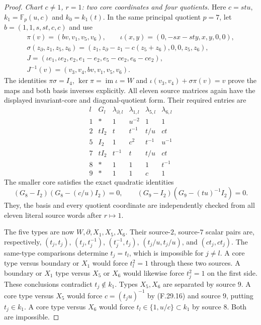 \begin{proof}
\emph{Chart $c\ne1$, $r=1$: two core coordinates and four quotients.}
Here $c=stu$, $k_1=\mathbb F_p(u,c)$ and
$k_0=k_1(t)$. In the same principal quotient
$p=7$, let $b=(1,1,s,st,c,c)$ and use
\[
 \begin{gathered}
 \pi(v)=(bv,v_1,v_5,v_6),\qquad
 \iota(x,y)=(0,-sx-sty,x,y,0,0),\\
 \sigma(z_\partial,z_1,z_5,z_6)
       =(z_1,z_\partial-z_1-c(z_5+z_6),0,0,z_5,z_6),\\
 J=(\iota e_1,\iota e_2,e_2,e_1-e_2,e_5-ce_2,e_6-ce_2),\\
 J^{-1}(v)=(v_3,v_4,bv,v_1,v_5,v_6).
 \end{gathered}                                                \tag{F.29.14}
\]
The identities $\pi\sigma=I_4$,
$\ker\pi=\operatorname{im}\iota=W$ and
$\iota(v_3,v_4)+\sigma\pi(v)=v$ prove the
maps and both basis inverses explicitly.
All eleven source matrices again have the
displayed invariant-core and diagonal-quotient
form. Their required entries are
\[
 \begin{array}{c|c|cccc}
 l&G_l&\lambda_{\partial,l}&\lambda_{1,l}
                         &\lambda_{5,l}&\lambda_{6,l}\\\hline
 1&*&1&u^{-2}&1&1\\
 2&tI_2&t&t^{-1}&t/u&ct\\
 5&I_2&1&c^2&t^{-1}&u^{-1}\\
 7&tI_2&t^{-1}&t&t/u&ct\\
 8&*&1&1&1&t^{-1}\\
 9&*&1&1&c&1
 \end{array}
                                                               \tag{F.29.15}
\]
The smaller core satisfies the exact quadratic
identities
\[
 (G_8-I_2)(G_8-(c/u)I_2)=0,
 \qquad (G_9-I_2)(G_9-(tu)^{-1}I_2)=0.
                                                               \tag{F.29.16}
\]
They, the basis and every quotient coordinate
are independently checked from all eleven
literal source words after $r\mapsto1$.

The five types are now $W,\partial,X_1,X_5,X_6$.
Their source-$2$, source-$7$ scalar pairs are,
respectively,
$(t_j,t_j)$, $(t_j,t_j^{-1})$,
$(t_j^{-1},t_j)$, $(t_j/u,t_j/u)$,
and $(ct_j,ct_j)$.
The same-type comparisons determine $t_j=t_l$,
which is impossible for $j\ne l$.
A core type versus boundary or $X_1$ would
force $t_l^2=1$ through these two sources.
A boundary or $X_1$ type versus $X_5$ or $X_6$
would likewise force $t_j^2=1$ on the first
side. These conclusions contradict
$t_j\notin k_1$.
Types $X_5,X_6$ are separated by source $9$.
A core type versus $X_5$ would force
$c=(t_ju)^{-1}$ by (F.29.16) and source $9$,
putting $t_j\in k_1$.
A core type versus $X_6$ would force
$t_l\in\{1,u/c\}\subset k_1$ by source $8$.
Both are impossible.


\end{proof}
